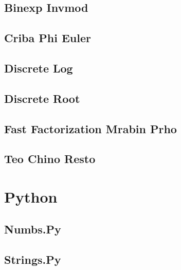 \documentclass[9pt,portrait,twocolumn,a4paper,notitlepage]{article}
\newcommand\cppfile[2][]{%
\ifstrempty{#1}{}{}%
}
\newcommand\pythonfile[2][]{%
\ifstrempty{#1}{}{}%
}
\begin{document}
\subsection{Binexp Invmod}
\cppfile{number_theory_clean/binexp_invmod.cpp}

\subsection{Criba Phi Euler}
\cppfile{number_theory_clean/criba_phi_euler.cpp}

\subsection{Discrete Log}
\cppfile{number_theory_clean/discrete_log.cpp}

\subsection{Discrete Root}
\cppfile{number_theory_clean/discrete_root.cpp}

\subsection{Fast Factorization Mrabin Prho}
\cppfile{number_theory_clean/fast_factorization_mrabin_prho.cpp}

\subsection{Teo Chino Resto}
\cppfile{number_theory_clean/teo_chino_resto.cpp}


\section{Python}

\subsection{Numbs.Py}
\pythonfile{Python_clean/numbs.py}

\subsection{Strings.Py}
\pythonfile{Python_clean/strings.py}

\end{document}
